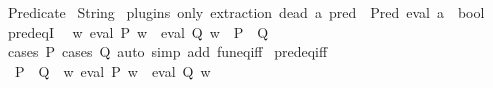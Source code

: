 %
\begin{isabellebody}%
%
%
\isadelimdocument
%
\endisadelimdocument
%
\isatagdocument
%
\isamarkuptrue%
%
\endisatagdocument
{\isafolddocument}%
%
\isadelimdocument
%
\endisadelimdocument
%
\isadelimtheory
%
\endisadelimtheory
%
\isatagtheory
{}\isamarkupfalse%
\ Predicate\isanewline
{}\ String\isanewline
{}%
\endisatagtheory
{\isafoldtheory}%
%
\isadelimtheory
%
\endisadelimtheory
%
\isadelimdocument
%
\endisadelimdocument
%
\isatagdocument
%
\isamarkuptrue%
%
\endisatagdocument
{\isafolddocument}%
%
\isadelimdocument
%
\endisadelimdocument
{}\isamarkupfalse%
\ {\isacharparenleft}{\kern0pt}plugins\ only{\isacharcolon}{\kern0pt}\ extraction{\isacharparenright}{\kern0pt}\ {\isacharparenleft}{\kern0pt}dead\ {\isacharprime}{\kern0pt}a{\isacharparenright}{\kern0pt}\ pred\ {\isacharequal}{\kern0pt}\ Pred\ {\isacharparenleft}{\kern0pt}eval{\isacharcolon}{\kern0pt}\ {\isachardoublequoteopen}{\isacharprime}{\kern0pt}a\ {\isasymRightarrow}\ bool{\isachardoublequoteclose}{\isacharparenright}{\kern0pt}\isanewline
\isanewline
{}\isamarkupfalse%
\ pred{\isacharunderscore}{\kern0pt}eqI{\isacharcolon}{\kern0pt}\isanewline
\ \ {\isachardoublequoteopen}{\isacharparenleft}{\kern0pt}{\isasymAnd}w{\isachardot}{\kern0pt}\ eval\ P\ w\ {\isasymlongleftrightarrow}\ eval\ Q\ w{\isacharparenright}{\kern0pt}\ {\isasymLongrightarrow}\ P\ {\isacharequal}{\kern0pt}\ Q{\isachardoublequoteclose}\isanewline
%
\isadelimproof
\ \ %
\endisadelimproof
%
\isatagproof
{}\isamarkupfalse%
\ {\isacharparenleft}{\kern0pt}cases\ P{\isacharcomma}{\kern0pt}\ cases\ Q{\isacharparenright}{\kern0pt}\ {\isacharparenleft}{\kern0pt}auto\ simp\ add{\isacharcolon}{\kern0pt}\ fun{\isacharunderscore}{\kern0pt}eq{\isacharunderscore}{\kern0pt}iff{\isacharparenright}{\kern0pt}%
\endisatagproof
{\isafoldproof}%
%
\isadelimproof
\isanewline
%
\endisadelimproof
\isanewline
{}\isamarkupfalse%
\ pred{\isacharunderscore}{\kern0pt}eq{\isacharunderscore}{\kern0pt}iff{\isacharcolon}{\kern0pt}\isanewline
\ \ {\isachardoublequoteopen}P\ {\isacharequal}{\kern0pt}\ Q\ {\isasymLongrightarrow}\ {\isacharparenleft}{\kern0pt}{\isasymAnd}w{\isachardot}{\kern0pt}\ eval\ P\ w\ {\isasymlongleftrightarrow}\ eval\ Q\ w{\isacharparenright}{\kern0pt}{\isachardoublequoteclose}\isanewline
%
\isadelimproof
\ \ %
\endisadelimproof
%
\isatagproof

\end{isabellebody}
